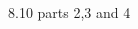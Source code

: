 \begin{problem}{8.6}
\end{problem}

\begin{problem}{8.10 parts 2,3 and 4}
\end{problem}

\begin{problem}{12.2}
\end{problem}

\begin{problem}{12.4}
\end{problem}

\begin{problem}{12.6}
\end{problem}



